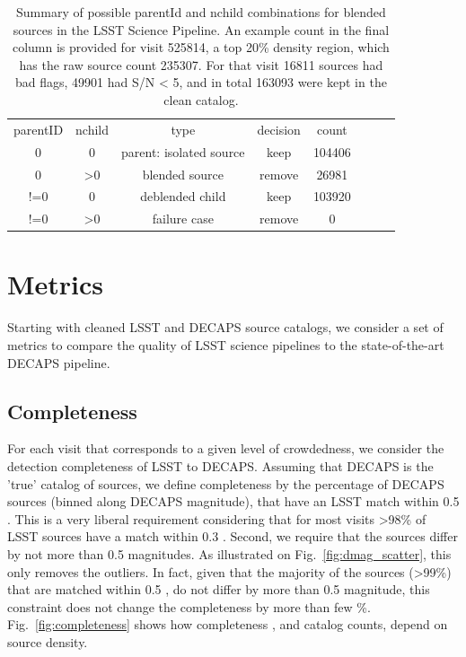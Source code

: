 \documentclass[DM,lsstdraft,toc,usenatbib]{lsstdoc}
\begin{document}
\begin{table}
\centering
\caption{ Summary of possible parentId and nchild combinations for blended sources in the LSST Science Pipeline. An example count in the final column is provided for visit 525814, a top 20\% density region, which has the raw source count 235307. For that visit  16811 sources had bad flags, 49901  had S/N < 5, and in total 163093 were kept in the clean catalog.  }
\label{tab:lsst_deblend}
\begin{tabular}{cccccccc}
parentID & nchild & type  & decision &  count \\
0 & 0 & parent: isolated source & keep & 104406 \\
0 & >0 & blended source & remove & 26981 \\
!=0 & 0 & deblended child & keep  &103920\\
!=0 & >0 & failure case & remove & 0 \\
\hline
\end{tabular}
\end{table}


\section{Metrics}
\label{sec:metrics}

Starting with cleaned LSST and DECAPS source catalogs, we consider a set of metrics to compare the quality of LSST science pipelines to the  state-of-the-art DECAPS pipeline.  

\subsection{Completeness}

For each visit that corresponds to a given level of crowdedness, we consider the detection completeness of LSST to DECAPS. Assuming that DECAPS is the 'true' catalog of sources, we define completeness by the percentage of DECAPS sources (binned along DECAPS magnitude), that have an LSST match within 0.5 \arcsec. This is a very liberal requirement considering that for most visits >98\% of LSST sources have a match within 0.3 \arcsec.  Second,  we require that the sources differ by not more than 0.5 magnitudes. As illustrated on Fig.~\ref{fig:dmag_scatter}, this only removes the outliers.  In fact, given that the majority of the sources (>99\%) that are matched within 0.5 \arcsec, do not differ by more than 0.5 magnitude, this constraint does not change the completeness by more than few \%.   Fig.~\ref{fig:completeness} shows how completeness , and catalog counts, depend on source density.
\end{document}
